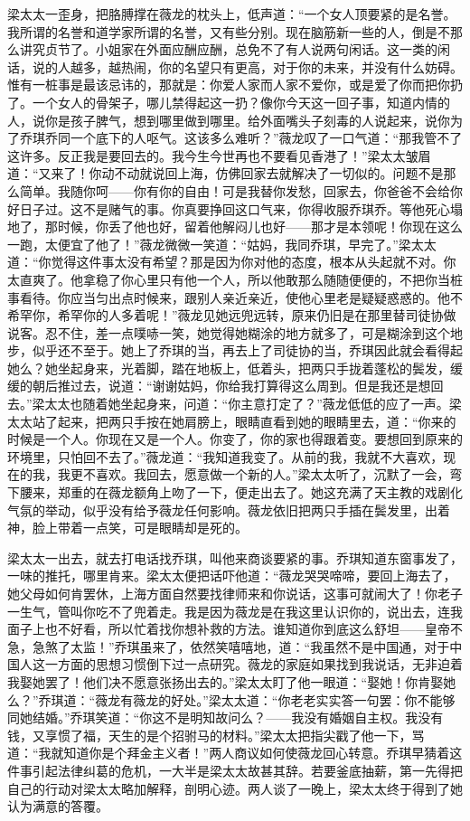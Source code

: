 \par 梁太太一歪身，把胳膊撑在薇龙的枕头上，低声道：“一个女人顶要紧的是名誉。我所谓的名誉和道学家所谓的名誉，又有些分别。现在脑筋新一些的人，倒是不那么讲究贞节了。小姐家在外面应酬应酬，总免不了有人说两句闲话。这一类的闲话，说的人越多，越热闹，你的名望只有更高，对于你的未来，并没有什么妨碍。惟有一桩事是最该忌讳的，那就是：你爱人家而人家不爱你，或是爱了你而把你扔了。一个女人的骨架子，哪儿禁得起这一扔？像你今天这一回子事，知道内情的人，说你是孩子脾气，想到哪里做到哪里。给外面嘴头子刻毒的人说起来，说你为了乔琪乔同一个底下的人呕气。这该多么难听？”薇龙叹了一口气道：“那我管不了这许多。反正我是要回去的。我今生今世再也不要看见香港了！”梁太太皱眉道：“又来了！你动不动就说回上海，仿佛回家去就解决了一切似的。问题不是那么简单。我随你呵——你有你的自由！可是我替你发愁，回家去，你爸爸不会给你好日子过。这不是赌气的事。你真要挣回这口气来，你得收服乔琪乔。等他死心塌地了，那时候，你丢了他也好，留着他解闷儿也好——那才是本领呢！你现在这么一跑，太便宜了他了！”薇龙微微一笑道：“姑妈，我同乔琪，早完了。”梁太太道：“你觉得这件事太没有希望？那是因为你对他的态度，根本从头起就不对。你太直爽了。他拿稳了你心里只有他一个人，所以他敢那么随随便便的，不把你当桩事看待。你应当匀出点时候来，跟别人亲近亲近，使他心里老是疑疑惑惑的。他不希罕你，希罕你的人多着呢！”薇龙见她远兜远转，原来仍旧是在那里替司徒协做说客。忍不住，差一点噗哧一笑，她觉得她糊涂的地方就多了，可是糊涂到这个地步，似乎还不至于。她上了乔琪的当，再去上了司徒协的当，乔琪因此就会看得起她么？她坐起身来，光着脚，踏在地板上，低着头，把两只手拢着蓬松的鬓发，缓缓的朝后推过去，说道：“谢谢姑妈，你给我打算得这么周到。但是我还是想回去。”梁太太也随着她坐起身来，问道：“你主意打定了？”薇龙低低的应了一声。梁太太站了起来，把两只手按在她肩膀上，眼睛直看到她的眼睛里去，道：“你来的时候是一个人。你现在又是一个人。你变了，你的家也得跟着变。要想回到原来的环境里，只怕回不去了。”薇龙道：“我知道我变了。从前的我，我就不大喜欢，现在的我，我更不喜欢。我回去，愿意做一个新的人。”梁太太听了，沉默了一会，弯下腰来，郑重的在薇龙额角上吻了一下，便走出去了。她这充满了天主教的戏剧化气氛的举动，似乎没有给予薇龙任何影响。薇龙依旧把两只手插在鬓发里，出着神，脸上带着一点笑，可是眼睛却是死的。
\par 梁太太一出去，就去打电话找乔琪，叫他来商谈要紧的事。乔琪知道东窗事发了，一味的推托，哪里肯来。梁太太便把话吓他道：“薇龙哭哭啼啼，要回上海去了，她父母如何肯罢休，上海方面自然要找律师来和你说话，这事可就闹大了！你老子一生气，管叫你吃不了兜着走。我是因为薇龙是在我这里认识你的，说出去，连我面子上也不好看，所以忙着找你想补救的方法。谁知道你到底这么舒坦——皇帝不急，急煞了太监！”乔琪虽来了，依然笑嘻嘻地，道：“我虽然不是中国通，对于中国人这一方面的思想习惯倒下过一点研究。薇龙的家庭如果找到我说话，无非迫着我娶她罢了！他们决不愿意张扬出去的。”梁太太盯了他一眼道：“娶她！你肯娶她么？”乔琪道：“薇龙有薇龙的好处。”梁太太道：“你老老实实答一句罢：你不能够同她结婚。”乔琪笑道：“你这不是明知故问么？——我没有婚姻自主权。我没有钱，又享惯了福，天生的是个招驸马的材料。”梁太太把指尖戳了他一下，骂道：“我就知道你是个拜金主义者！”两人商议如何使薇龙回心转意。乔琪早猜着这件事引起法律纠葛的危机，一大半是梁太太故甚其辞。若要釜底抽薪，第一先得把自己的行动对梁太太略加解释，剖明心迹。两人谈了一晚上，梁太太终于得到了她认为满意的答覆。
